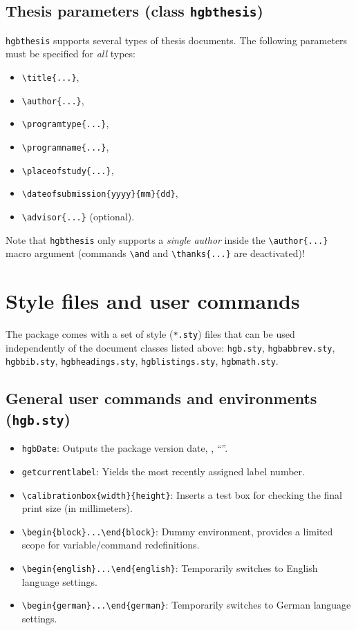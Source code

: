 \documentclass[english]{hgbarticle}
\begin{document}
\subsection{Thesis parameters (class \texttt{hgbthesis})}

\texttt{hgbthesis} supports several types of thesis documents. The following
parameters must be specified for \emph{all} types:
%
\begin{itemize}
    \item \verb!\title{...}!,
    \item \verb!\author{...}!,
    \item \verb!\programtype{...}!,
    \item \verb!\programname{...}!,
    \item \verb!\placeofstudy{...}!,
    \item \verb!\dateofsubmission{yyyy}{mm}{dd}!,
    \item \verb!\advisor{...}! (optional).
\end{itemize}
%
Note that \texttt{hgbthesis} only supports a \emph{single author} inside the
\verb!\author{...}! macro argument (commands \verb!\and! and
\verb!\thanks{...}! are deactivated)!


\section{Style files and user commands}

The package comes with a set of style (\texttt{*.sty}) files that can be used
independently of the document classes listed above:
\texttt{hgb.sty},
\texttt{hgbabbrev.sty},
\texttt{hgbbib.sty},
\texttt{hgbheadings.sty},
\texttt{hgblistings.sty},
\texttt{hgbmath.sty}.


\subsection{General user commands and environments (\texttt{hgb.sty})}

\begin{itemize}
    \item \texttt{{\bs}hgbDate}: Outputs the package version date,
    \eg, ``\texttt{\hgbDate}''.
		\item \texttt{{\bs}getcurrentlabel}: Yields the most recently assigned
		label number.
    \item \verb!\calibrationbox{width}{height}!: Inserts a test box for
    checking the final print size (in millimeters).
		\item \verb!\begin{block}...\end{block}!: Dummy environment, provides
		a limited scope for variable/command redefinitions.
    \item \verb!\begin{english}...\end{english}!: Temporarily switches 
		to English language settings.
    \item \verb!\begin{german}...\end{german}!: Temporarily switches 
		to German language settings.
\end{itemize}
\end{document}
